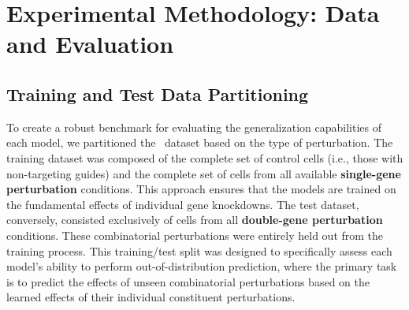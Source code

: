 \section{Experimental Methodology: Data and Evaluation}
\label{app:methodology}

\subsection{Training and Test Data Partitioning}
\label{app:methodology:partitioning}

To create a robust benchmark for evaluating the generalization capabilities of each model, we partitioned the~\cite{norman2019exploring} dataset based on the type of perturbation. The training dataset was composed of the complete set of control cells (i.e., those with non-targeting guides) and the complete set of cells from all available \textbf{single-gene perturbation} conditions. This approach ensures that the models are trained on the fundamental effects of individual gene knockdowns. The test dataset, conversely, consisted exclusively of cells from all \textbf{double-gene perturbation} conditions. These combinatorial perturbations were entirely held out from the training process. This training/test split was designed to specifically assess each model's ability to perform out-of-distribution prediction, where the primary task is to predict the effects of unseen combinatorial perturbations based on the learned effects of their individual constituent perturbations.
